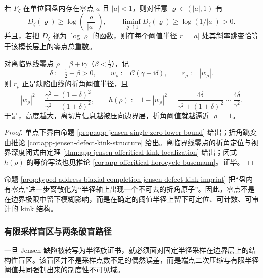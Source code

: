 \begin{proposition}\label{prop:typed-address-biaxial-completion-jensen-defect-kink-imprint}
若 \(F_{\zeta}\) 在单位圆盘内存在零点 \(a\) 且 \(|a|<1\)，则对任意 \(\varrho\in(|a|,1)\) 有
\[
D_{\zeta}(\varrho)\ge \log\!\left(\frac{\varrho}{|a|}\right),
\qquad
\liminf_{\varrho\uparrow 1}D_{\zeta}(\varrho)\ge \log(1/|a|)>0.
\]
并且，若把 \(D_{\zeta}\) 视为 \(\log\varrho\) 的函数，则在每个阈值半径 \(r=|a|\) 处其斜率跳变恰等于该模长层上的零点总重数。

对离临界线零点 \(\rho=\beta+\mathrm{i}\gamma\)（\(\beta<\tfrac12\)），记
\[
\delta:=\tfrac12-\beta>0,
\qquad
w_{\rho}:=\mathcal{C}(\gamma+\mathrm{i}\delta),
\qquad
r_{\rho}:=|w_{\rho}|.
\]
则 \(r_{\rho}\) 正是缺陷曲线的折角阈值半径，且
\[
|w_{\rho}|^2
=
\frac{\gamma^2+(1-\delta)^2}{\gamma^2+(1+\delta)^2},
\qquad
h(\rho):=1-|w_{\rho}|^2
=
\frac{4\delta}{\gamma^2+(1+\delta)^2}
\sim
\frac{4\delta}{\gamma^2}.
\]
于是，高度越大，离切片信息越被压向边界层，折角阈值就越逼近 \(\varrho=1\)。
\end{proposition}
\begin{proof}
单点下界由命题 \ref{prop:app-jensen-single-zero-lower-bound} 给出；折角跳变由推论 \ref{cor:app-jensen-defect-kink-structure} 给出。离临界线零点的折角定位与视界深度闭式由定理 \ref{thm:app-jensen-offcritical-kink-localization} 给出；闭式 \(h(\rho)\) 的等价写法也见推论 \ref{cor:app-offcritical-horocycle-busemann}。证毕。
\end{proof}

命题 \ref{prop:typed-address-biaxial-completion-jensen-defect-kink-imprint} 把“盘内有零点”进一步离散化为“半径轴上出现一个不可去的折角原子”。因此，零点不是在边界极限中留下模糊影响，而是在确定的阈值半径上留下可定位、可计数、可审计的 kink 结构。

\subsubsection{有限采样盲区与两条破盲路径}\label{subsubsec:typed-address-biaxial-completion-jensen-defect-blindspot}
一旦 Jensen 缺陷被转写为半径族证书，就必须面对固定半径采样在边界层上的结构性盲区。该盲区并不是采样点数不足的偶然误差，而是端点二次压缩与有限半径阈值共同强制出来的制度性不可见域。

